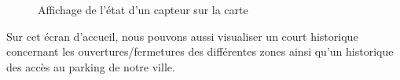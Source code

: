 \begin{figure}[H]
    \begin{center}
        \caption{Affichage de l'état d'un capteur sur la carte}\label{etat-capteur}
    \end{center}
\end{figure}
\vspace{-0.5cm}
Sur cet écran d’accueil, nous pouvons aussi visualiser un court historique concernant les ouvertures/fermetures des différentes zones ainsi qu’un historique des accès au parking de notre ville.

